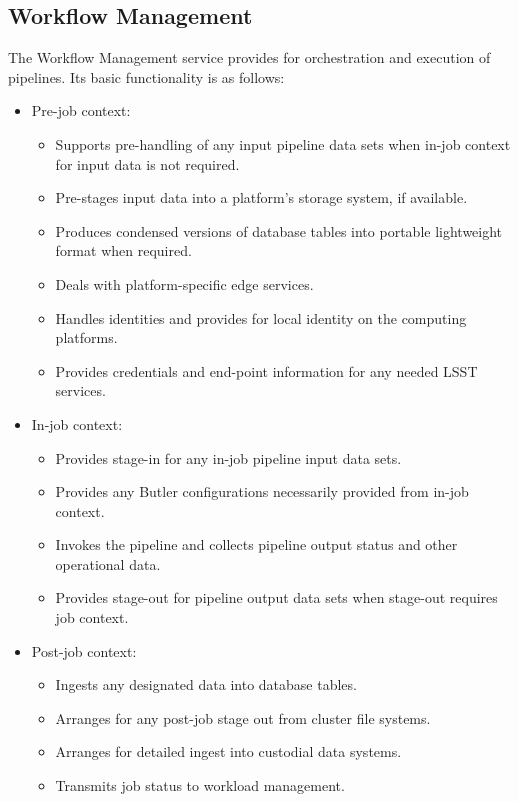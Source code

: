 \documentclass[DM,lsstdraft,toc]{lsstdoc}
\begin{document}
\subsection{Workflow Management}\label{workflow-management}

The Workflow Management service provides for orchestration and execution of
pipelines.  Its basic functionality is as follows:
\begin{itemize}
	\item Pre-job context:
		\begin{itemize}
			\item Supports pre-handling of any input pipeline data sets when in-job context for input data is not required.
			\item Pre-stages input data into a platform’s storage system, if available.
			\item Produces condensed versions of database tables into portable lightweight format when required.
			\item Deals with platform-specific edge services.
			\item Handles identities and provides for local identity on the computing platforms.
			\item Provides credentials and end-point information for any needed LSST services. 
		\end{itemize}
	\item In-job context:
		\begin{itemize}
			\item Provides stage-in for any in-job pipeline input data sets.
			\item Provides any Butler configurations necessarily provided from in-job context.
			\item Invokes the pipeline and collects pipeline output status and other operational data.
			\item Provides stage-out for pipeline output data sets when stage-out requires job context.
		\end{itemize}
	\item Post-job context:
		\begin{itemize}
			\item Ingests any designated data into database tables.
			\item Arranges for any post-job stage out from cluster file systems.
			\item Arranges for detailed ingest into custodial data systems.
			\item Transmits job status to workload management.
		\end{itemize}
\end{itemize}
 
\end{document}
